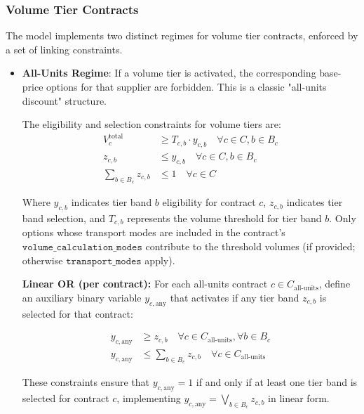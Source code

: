 \subsubsection{Volume Tier Contracts}
The model implements two distinct regimes for volume tier contracts, enforced by a set of linking constraints.
\begin{itemize}
    \item \textbf{All-Units Regime}: If a volume tier is activated, the corresponding base-price options for that supplier are forbidden. This is a classic "all-units discount" structure.
    
    The eligibility and selection constraints for volume tiers are:
    \begin{align}
    V_c^{\text{total}} &\ge T_{c,b} \cdot y_{c,b} \quad \forall c \in C, b \in B_c \label{eq:tier-eligibility} \\
    z_{c,b} &\le y_{c,b} \quad \forall c \in C, b \in B_c \label{eq:tier-selection} \\
    \sum_{b \in B_c} z_{c,b} &\le 1 \quad \forall c \in C \label{eq:tier-at-most-one}
    \end{align}
    
    Where $y_{c,b}$ indicates tier band $b$ eligibility for contract $c$, $z_{c,b}$ indicates tier band selection, and $T_{c,b}$ represents the volume threshold for tier band $b$. Only options whose transport modes are included in the contract's $\texttt{volume\_calculation\_modes}$ contribute to the threshold volumes (if provided; otherwise $\texttt{transport\_modes}$ apply).

    \textbf{Linear OR (per contract):} For each all-units contract $c \in C_{\text{all-units}}$, define an auxiliary binary variable $y_{c,\text{any}}$ that activates if any tier band $z_{c,b}$ is selected for that contract:

    \begin{align}
    y_{c,\text{any}} &\geq z_{c,b} \quad \forall c \in C_{\text{all-units}}, \forall b \in B_c \label{eq:or-constraint-1c} \\
    y_{c,\text{any}} &\leq \sum_{b \in B_c} z_{c,b} \quad \forall c \in C_{\text{all-units}} \label{eq:or-constraint-2c}
    \end{align}

    These constraints ensure that $y_{c,\text{any}} = 1$ if and only if at least one tier band is selected for contract $c$, implementing $y_{c,\text{any}} = \bigvee_{b \in B_c} z_{c,b}$ in linear form.
    

\end{itemize}
